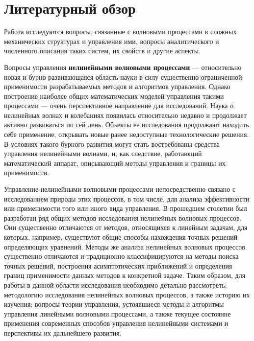 \chapter{Литературный обзор}


Работа исследуются вопросы, связанные с волновыми процессами в сложных механических структурах и управления ими, вопросы аналитического и численного описания таких систем, их свойств и другие аспекты.

Вопросы управления \textbf{нелинейными волновыми процессами} --- относительно новая и бурно развивающаяся область науки в силу существенно ограниченной применимости разрабатываемых методов и алгоритмов управления. Однако построение наиболее общих математических моделей управления такими процессами --- очень перспективное направление для исследований. Наука о нелинейных волнах и колебаниях появилась относительно недавно и продолжает активно развиваться по сей день. Объекты ее исследования продолжают находить себе применение, открывать новые ранее недоступные технологические решения. В условиях такого бурного развития могут стать востребованы средства управления нелинейными волнами, и, как следствие, работающий математический аппарат, описывающий методы управления и границы их применимости.

Управление нелинейными волновыми процессами непосредственно связано с исследованием природы этих процессов, в том числе, для анализа эффективности или применимости того или иного вида управления. В прошедшем столетии был разработан ряд общих методов исследования нелинейных волновых процессов. Они существенно отличаются от методов, относящихся к линейным задачам, для которых, например, существуют общие способы нахождения точных решений определяющих уравнений. Методы же анализа нелинейных волновых процессов существенно отличаются и традиционно классифицируются на методы поиска точных решений, построения асимптотических приближений и определения границ применимости данных методов к конкретной задаче. Таким образом, для работы в данной области исследования необходимо детально рассмотреть: методологию исследования нелинейных волновых процессов, а также историю их изучения; вопросы теории управления, устоявшиеся методы и алгоритмы управления линейными волновыми процессами, а также текущее состояние применения современных способов управления нелинейными системами и перспективы их дальнейшего развития.

